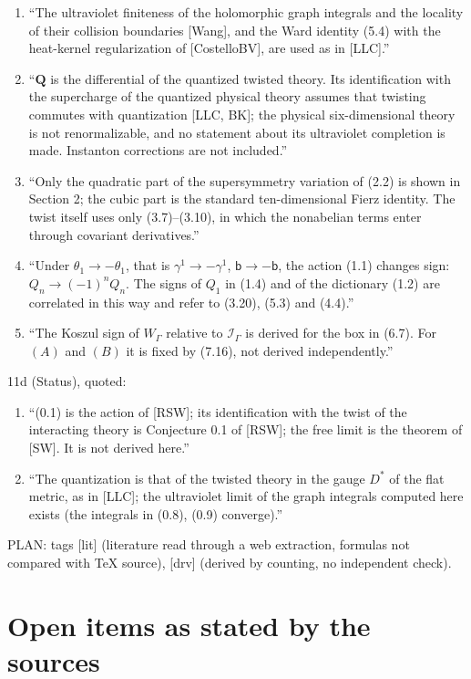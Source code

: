 \documentclass[10pt,a4paper]{article}
\numberwithin{equation}{section}
\newcommand{\cI}{\mathcal I}
\begin{document}
\begin{enumerate}\itemsep1pt
\item ``The ultraviolet finiteness of the holomorphic graph integrals and the locality of their collision boundaries [Wang], and the Ward identity (5.4) with the heat-kernel regularization of [CostelloBV], are used as in [LLC].''
\item ``$\mathbf Q$ is the differential of the quantized twisted theory. Its identification with the supercharge of the quantized physical theory assumes that twisting commutes with quantization [LLC, BK]; the physical six-dimensional theory is not renormalizable, and no statement about its ultraviolet completion is made. Instanton corrections are not included.''
\item ``Only the quadratic part of the supersymmetry variation of (2.2) is shown in Section 2; the cubic part is the standard ten-dimensional Fierz identity. The twist itself uses only (3.7)--(3.10), in which the nonabelian terms enter through covariant derivatives.''
\item ``Under $\theta_1\to-\theta_1$, that is $\gamma^1\to-\gamma^1$, $\mathsf b\to-\mathsf b$, the action (1.1) changes sign: $Q_n\to(-1)^nQ_n$. The signs of $Q_1$ in (1.4) and of the dictionary (1.2) are correlated in this way and refer to (3.20), (5.3) and (4.4).''
\item ``The Koszul sign of $W_\Gamma$ relative to $\cI_\Gamma$ is derived for the box in (6.7). For $(A)$ and $(B)$ it is fixed by (7.16), not derived independently.''
\end{enumerate}
\textsf{11d} (Status), quoted:
\begin{enumerate}\itemsep1pt
\item ``(0.1) is the action of [RSW]; its identification with the twist of the interacting theory is Conjecture 0.1 of [RSW]; the free limit is the theorem of [SW]. It is not derived here.''
\item ``The quantization is that of the twisted theory in the gauge $D^*$ of the flat metric, as in [LLC]; the ultraviolet limit of the graph integrals computed here exists (the integrals in (0.8), (0.9) converge).''
\end{enumerate}
\textsf{PLAN}: tags [lit] (literature read through a web extraction, formulas not compared with TeX source), [drv] (derived by counting, no independent check).

\section{Open items as stated by the sources}\label{sec-open}
\end{document}
